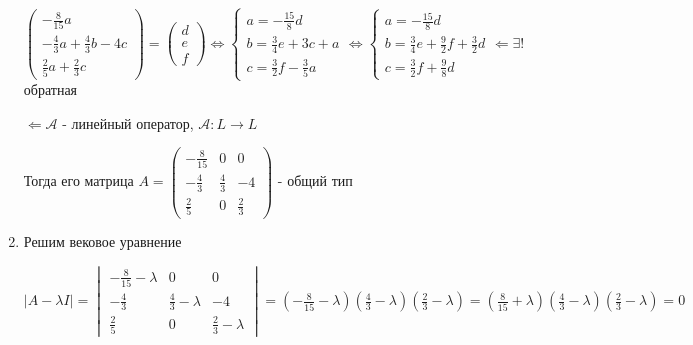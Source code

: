 \begin{enumerate}
    $\displaystyle \begin{pmatrix}
         -\frac{8}{15}a                    \\
         -\frac{4}{3}a + \frac{4}{3}b - 4c \\
         \frac{2}{5}a + \frac{2}{3}c
    \end{pmatrix} =
    \begin{pmatrix}
        d \\ e \\ f
    \end{pmatrix} \Longleftrightarrow
    \begin{cases}
        a = -\frac{15}{8}d \\
        b = \frac{3}{4}e + 3c + a \\
        c = \frac{3}{2}f - \frac{3}{5}a
    \end{cases} \Longleftrightarrow
    \begin{cases}
        a = -\frac{15}{8}d \\
        b = \frac{3}{4}e + \frac{9}{2}f + \frac{3}{2}d \\
        c = \frac{3}{2}f + \frac{9}{8}d
    \end{cases} \Longleftarrow \exists!$ обратная

    $\Longleftarrow \mathcal{A}$ - линейный оператор, $\mathcal{A}: L \to L$

    Тогда его матрица $\displaystyle A =
    \begin{pmatrix}
        -\frac{8}{15} & 0           & 0           \\
        -\frac{4}{3}  & \frac{4}{3} & - 4         \\
        \frac{2}{5}   & 0           & \frac{2}{3}
    \end{pmatrix}$ - общий тип

    \item Решим вековое уравнение

    $\displaystyle |A - \lambda I| =
    \begin{vmatrix}
        -\frac{8}{15} - \lambda & 0                     & 0                     \\
        -\frac{4}{3}            & \frac{4}{3} - \lambda & - 4                   \\
        \frac{2}{5}             & 0                     & \frac{2}{3} - \lambda
    \end{vmatrix} = \left(-\frac{8}{15} - \lambda\right) \left(\frac{4}{3} - \lambda\right) \left(\frac{2}{3} - \lambda\right) =
    \left(\frac{8}{15} + \lambda\right) \left(\frac{4}{3} - \lambda\right) \left(\frac{2}{3} - \lambda\right) = 0$


\end{enumerate}
